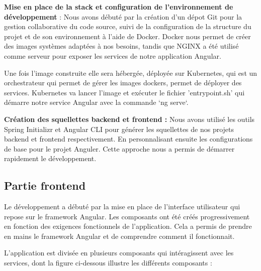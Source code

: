 \textbf{Mise en place de la stack et configuration de l'environnement de développement} : Nous avons débuté par la création d'un dépot Git pour la gestion collaborative du code source, suivi de la configuration de la structure du projet et de son environnement à l'aide de Docker. Docker nous permet de créer des images systèmes adaptées à nos besoins, tandis que NGINX a été utilisé comme serveur pour exposer les services de notre application Angular.
\medskip

Une fois l'image construite elle sera hébergée, déployée sur Kubernetes, qui est un orchestrateur qui permet de gérer les images dockers, permet de déployer des services. Kubernetes va lancer l'image et exécuter le fichier 'entrypoint.sh' qui démarre notre service Angular avec la commande  `ng serve`.
\medskip

\textbf{Création des squellettes backend et frontend :} Nous avons utilisé les outils Spring Initializr et Angular CLI pour générer les squellettes de nos projets backend et frontend respectivement. En personnalisant ensuite les configurations de base pour le projet Anguler. Cette approche nous a permis de démarrer rapidement le développement.
\medskip

    \subsection{Partie frontend}
    Le développement a débuté par la mise en place de l'interface utilisateur qui repose sur le framework Angular. Les composants ont été créés progressivement en fonction des exigences fonctionnels de l'application. Cela a permis de prendre en mains le framework Angular et de comprendre comment il fonctionnait.
    \medskip

    L'application est divisée en plusieurs composants qui intéragissent avec les services, dont la figure ci-dessous illustre les différents composants :
    \medskip

